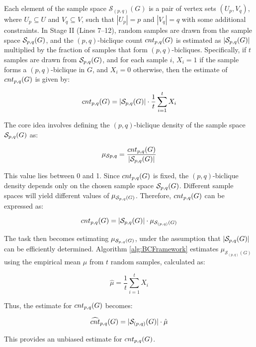  Each element of the sample space $\mathcal{S}_{(p,q)}(G)$ is a pair of vertex sets $(U_p, V_q)$, where $U_p \subseteq U$ and $V_q \subseteq V$, such that $|U_p|=p$ and $|V_q|=q$ with some additional constraints.
In Stage II (Lines 7–12), random samples are drawn from the sample space $\mathcal{S}_{p,q}(G)$, and the $(p,q)$-biclique count ${cnt_{p,q}(G) }$ is estimated as $|\mathcal{S}_{p,q}(G)|$ multiplied by the fraction of samples that form $(p,q)$-bicliques. Specifically, if $t$ samples are drawn from $\mathcal{S}_{p,q}(G)$, and for each sample $i$, $X_i = 1$ if the sample forms a $(p,q)$-biclique in $G$, and $X_i = 0$ otherwise, then the estimate of ${cnt_{p,q}(G) }$ is given by:

\begin{equation}
	{cnt_{p,q}(G) } = |\mathcal{S}_{p,q}(G)| \cdot \frac{1}{t} \sum_{i=1}^{t} X_i \label{eq}
\end{equation}

The core idea involves defining the $(p,q)$-biclique density of the sample space $\mathcal{S}_{p,q}(G)$ as:

\begin{equation} \mu_{\mathcal{S}{p,q}} = \frac{{cnt_{p,q}(G) }}{|\mathcal{S}_{p,q}(G)|} \label{eq
} \end{equation}

This value lies between 0 and 1. Since ${cnt_{p,q}(G) }$ is fixed, the $(p,q)$-biclique density depends only on the chosen sample space $\mathcal{S}_{p,q}(G)$. Different sample spaces will yield different values of $\mu_{\mathcal{S}_{p,q}(G)}$. Therefore, ${cnt_{p,q}(G) }$ can be expressed as:

\begin{equation} {cnt_{p,q}(G) } = |\mathcal{S}_{p,q}(G)| \cdot \mu_{\mathcal{S}_{(p,q)}(G)} \end{equation}

The task then becomes estimating $\mu_{\mathcal{S}_{p,q}(G)}$, under the assumption that $|\mathcal{S}_{p,q}(G)|$ can be efficiently determined. Algorithm \ref{alg:BCFramework} estimates $\mu_{\mathcal{S}_{(p,q)}(G)}$ using the empirical mean $\hat{\mu}$ from $t$ random samples, calculated as:

\begin{equation} \hat{\mu} = \frac{1}{t} \sum_{i=1}^{t} X_i \label{eq
} \end{equation}

Thus, the estimate for ${cnt_{p,q}(G) }$ becomes:

\begin{equation} {\widehat{cnt}_{p,q}(G) } = |\mathcal{S}_{(p,q)}(G)| \cdot \hat{\mu} \end{equation}

This provides an unbiased estimate for ${cnt_{p,q}(G) }$.

